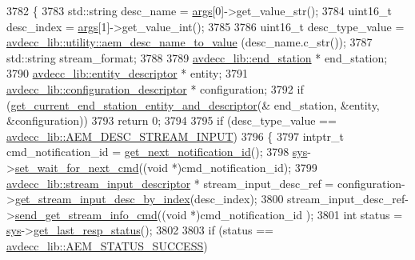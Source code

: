 \begin{DoxyCode}
3782 \{
3783     std::string desc\_name = \hyperlink{namespaceastime__fitline_a8187411843a6284ffb964ef3fb9fcab3}{args}[0]->get\_value\_str();
3784     uint16\_t desc\_index = \hyperlink{namespaceastime__fitline_a8187411843a6284ffb964ef3fb9fcab3}{args}[1]->get\_value\_int();
3785 
3786     uint16\_t desc\_type\_value = \hyperlink{namespaceavdecc__lib_1_1utility_a9f6076e32fa227555a95b6e95ea1e29b}{avdecc\_lib::utility::aem\_desc\_name\_to\_value}
      (desc\_name.c\_str());
3787     std::string stream\_format;
3788 
3789     \hyperlink{classavdecc__lib_1_1end__station}{avdecc\_lib::end\_station} * end\_station;
3790     \hyperlink{classavdecc__lib_1_1entity__descriptor}{avdecc\_lib::entity\_descriptor} * entity;
3791     \hyperlink{classavdecc__lib_1_1configuration__descriptor}{avdecc\_lib::configuration\_descriptor} * configuration;
3792     \textcolor{keywordflow}{if} (\hyperlink{classcmd__line_ac2d4611fba7db03d436a2e3c1e64828e}{get\_current\_end\_station\_entity\_and\_descriptor}(&
      end\_station, &entity, &configuration))
3793         \textcolor{keywordflow}{return} 0;
3794 
3795     \textcolor{keywordflow}{if} (desc\_type\_value == \hyperlink{namespaceavdecc__lib_ac7b7d227e46bc72b63ee9e9aae15902fa00d002e47651a1b007d50f9f2da51e53}{avdecc\_lib::AEM\_DESC\_STREAM\_INPUT})
3796     \{
3797         intptr\_t cmd\_notification\_id = \hyperlink{classcmd__line_a57486218387d1aa9d262eb7c176154ad}{get\_next\_notification\_id}();
3798         \hyperlink{classcmd__line_a485db4800e331cb4052c447fdf5d154e}{sys}->\hyperlink{classavdecc__lib_1_1system_a26b769584f10225077da47583edda33e}{set\_wait\_for\_next\_cmd}((\textcolor{keywordtype}{void} *)cmd\_notification\_id);
3799         \hyperlink{classavdecc__lib_1_1stream__input__descriptor}{avdecc\_lib::stream\_input\_descriptor} * stream\_input\_desc\_ref = 
      configuration->\hyperlink{classavdecc__lib_1_1configuration__descriptor_a69cfe9032cea21937b4153878f8a925c}{get\_stream\_input\_desc\_by\_index}(desc\_index);
3800         stream\_input\_desc\_ref->\hyperlink{classavdecc__lib_1_1stream__input__descriptor_af1004affeb5ff3cf8bb9356ebcaa3aae}{send\_get\_stream\_info\_cmd}((\textcolor{keywordtype}{void} *)cmd\_notification\_id
      );
3801         \textcolor{keywordtype}{int} status = \hyperlink{classcmd__line_a485db4800e331cb4052c447fdf5d154e}{sys}->\hyperlink{classavdecc__lib_1_1system_aa63e8d1a4e51f695cdcccc9340922407}{get\_last\_resp\_status}();
3802 
3803         \textcolor{keywordflow}{if} (status == \hyperlink{namespaceavdecc__lib_affd436edb2cecd20cfd784a84f852b2bac947077909cb590b84f4b5db413080e0}{avdecc\_lib::AEM\_STATUS\_SUCCESS})

\end{DoxyCode}
